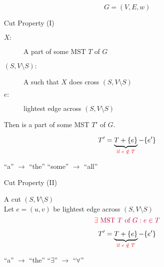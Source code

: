 
\begin{frame}{}
  \centerline{}

  \[
    G = (V, E, w)
  \]
\end{frame}

\begin{frame}{}
  \begin{exampleblock}{Cut Property (I)}
    \begin{description}
      \item[$X:$] A part of some MST $T$ of $G$
      \item[$(S, V \setminus S):$] A  such that $X$ does  cross $(S, V \setminus S)$
    ­ \item[$e:$]  lightest edge across $(S, V \setminus S)$
    \end{description}

    \pause
    \vspace{0.30cm}
    \centerline{Then  is a part of some MST $T'$ of $G$.}
  \end{exampleblock}

  \pause
  \vspace{0.60cm}
  \centerline{}
\end{frame}

\begin{frame}{}
  \centerline{}

  \pause
  \vspace{0.30cm}

  \pause
  \[
    T' = \underbrace{T + \{e\}}_{\textcolor{red}{\text{if } e \;\notin\; T}} - \{e'\}
  \]

  \pause
  \centerline{``a'' $\to$ ``the'' \red{$\implies$} ``some'' $\to$ ``all''}
\end{frame}

\begin{frame}{}
  \begin{exampleblock}{Cut Property (II)}
    \begin{center}
      A cut $(S, V \setminus S)$ \\[6pt]
      Let $e = (u,v)$ be  lightest edge across $(S, V \setminus S)$
      \[
	\textcolor{purple}{\textcolor{red}{\exists} \text{ MST $T$ of } G: e \in T}
      \]
    \end{center}
  \end{exampleblock}


  \pause
  \vspace{-0.50cm}
  \[
    T' = \underbrace{T + \{e\}}_{\textcolor{red}{\text{if } e \;\notin\; T}} - \{e'\}
  \]
  
  \pause
  \centerline{``a'' $\to$ ``the'' \red{$\implies$} ``$\exists$'' $\to$ ``$\forall$''}
\end{frame}

